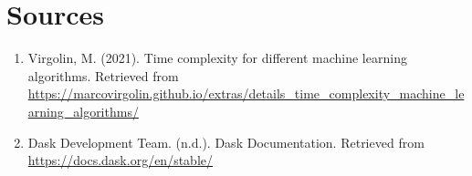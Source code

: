 \documentclass[11pt,a4paper]{article}
\begin{document}
\section{Sources}
\begin{enumerate}
    \item Virgolin, M. (2021). Time complexity for different machine learning algorithms. Retrieved from \url{https://marcovirgolin.github.io/extras/details_time_complexity_machine_learning_algorithms/}
    \item Dask Development Team. (n.d.). Dask Documentation. Retrieved from \url{https://docs.dask.org/en/stable/}
\end{enumerate}
\end{document}
